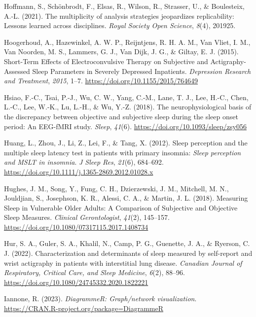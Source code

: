 \documentclass[
]{article}
\newlength{\cslhangindent}
\newenvironment{CSLReferences}[2] %
 {\begin{list}{}{%
  \setlength{\itemindent}{0pt}
  \setlength{\leftmargin}{0pt}
  \setlength{\parsep}{0pt}
  \ifodd #1
   \setlength{\leftmargin}{\cslhangindent}
   \setlength{\itemindent}{-1\cslhangindent}
  \fi
  \setlength{\itemsep}{#2\baselineskip}}}
 {\end{list}}
\begin{document}
\begin{CSLReferences}{1}{0}
Hoffmann, S., Schönbrodt, F., Elsas, R., Wilson, R., Strasser, U., \& Boulesteix, A.-L. (2021). The multiplicity of analysis strategies jeopardizes replicability: Lessons learned across disciplines. \emph{Royal Society Open Science}, \emph{8}(4), 201925.

Hoogerhoud, A., Hazewinkel, A. W. P., Reijntjens, R. H. A. M., Van Vliet, I. M., Van Noorden, M. S., Lammers, G. J., Van Dijk, J. G., \& Giltay, E. J. (2015). Short-{Term} {Effects} of {Electroconvulsive} {Therapy} on {Subjective} and {Actigraphy}-{Assessed} {Sleep} {Parameters} in {Severely} {Depressed} {Inpatients}. \emph{Depression Research and Treatment}, \emph{2015}, 1--7. \url{https://doi.org/10.1155/2015/764649}

Hsiao, F.-C., Tsai, P.-J., Wu, C. W., Yang, C.-M., Lane, T. J., Lee, H.-C., Chen, L.-C., Lee, W.-K., Lu, L.-H., \& Wu, Y.-Z. (2018). The neurophysiological basis of the discrepancy between objective and subjective sleep during the sleep onset period: An {EEG}-{fMRI} study. \emph{Sleep}, \emph{41}(6). \url{https://doi.org/10.1093/sleep/zsy056}

Huang, L., Zhou, J., Li, Z., Lei, F., \& Tang, X. (2012). Sleep perception and the multiple sleep latency test in patients with primary insomnia: \emph{{Sleep} perception and {MSLT} in insomnia}. \emph{J Sleep Res}, \emph{21}(6), 684--692. \url{https://doi.org/10.1111/j.1365-2869.2012.01028.x}

Hughes, J. M., Song, Y., Fung, C. H., Dzierzewski, J. M., Mitchell, M. N., Jouldjian, S., Josephson, K. R., Alessi, C. A., \& Martin, J. L. (2018). Measuring {Sleep} in {Vulnerable} {Older} {Adults}: {A} {Comparison} of {Subjective} and {Objective} {Sleep} {Measures}. \emph{Clinical Gerontologist}, \emph{41}(2), 145--157. \url{https://doi.org/10.1080/07317115.2017.1408734}

Hur, S. A., Guler, S. A., Khalil, N., Camp, P. G., Guenette, J. A., \& Ryerson, C. J. (2022). Characterization and determinants of sleep measured by self-report and wrist actigraphy in patients with interstitial lung disease. \emph{Canadian Journal of Respiratory, Critical Care, and Sleep Medicine}, \emph{6}(2), 88--96. \url{https://doi.org/10.1080/24745332.2020.1822221}

Iannone, R. (2023). \emph{DiagrammeR: Graph/network visualization}. \url{https://CRAN.R-project.org/package=DiagrammeR}


\end{CSLReferences}
\end{document}
